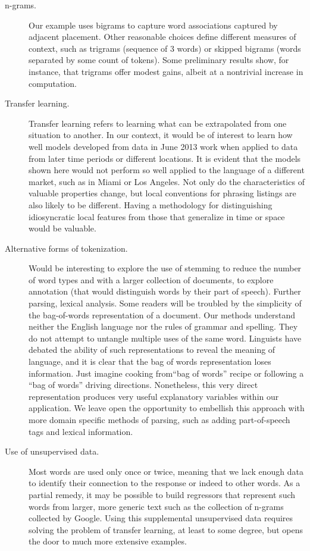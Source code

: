 \documentclass[10pt]{article}
\begin{document}
   \begin{description}
   
   \item[n-grams.]  Our example uses bigrams to capture word associations captured by adjacent placement.  Other reasonable choices define different measures of context,  such as trigrams (sequence of 3 words) or skipped bigrams (words separated by some count of tokens).  Some preliminary results show, for instance, that trigrams offer modest gains, albeit at a nontrivial increase in computation.
   
   \item[Transfer learning.]  Transfer learning refers to learning what can be extrapolated from one situation to another.  In our context, it would be of interest to learn how well models developed from data in June 2013 work when applied to data from later time periods or different locations.  It is evident that the models shown here would not perform so well applied to the language of a different market, such as in Miami or Los Angeles.  Not only do the characteristics of valuable properties change, but  local conventions for phrasing listings are also likely to be different.  Having a methodology for distinguishing idiosyncratic local features from those that generalize in time or space would be valuable. 
   
  \item[Alternative forms of tokenization.] Would be interesting to explore the use of stemming to reduce the number of word types and with a larger collection of documents, to explore annotation (that would distinguish words by their part of speech).  Further parsing, lexical analysis.  Some readers will be troubled by the simplicity of the  bag-of-words representation of a document.  Our methods understand neither the English language nor the rules of grammar and spelling.  They do not attempt to untangle  multiple uses of the same word.  Linguists have debated the ability of such  representations to reveal the meaning of language, and it is clear that the bag of words representation loses information.  Just imagine cooking from``bag of words'' recipe or following a ``bag of words'' driving directions.  Nonetheless, this very direct representation produces very useful explanatory variables within our application.  We leave open the opportunity to embellish this approach with more domain specific methods of parsing, such as adding part-of-speech tags and lexical information.
   
   \item[Use of unsupervised data.] Most words are used only once or twice, meaning that we lack enough data to identify their connection to the response or indeed to other words.  As a partial remedy, it may be possible to build regressors that represent such words from larger, more generic text such as the collection of n-grams collected by Google.  Using this supplemental unsupervised data requires solving the problem of transfer learning, at least to some degree, but opens the door to much more extensive examples. 
   

\end{description}
\end{document}
